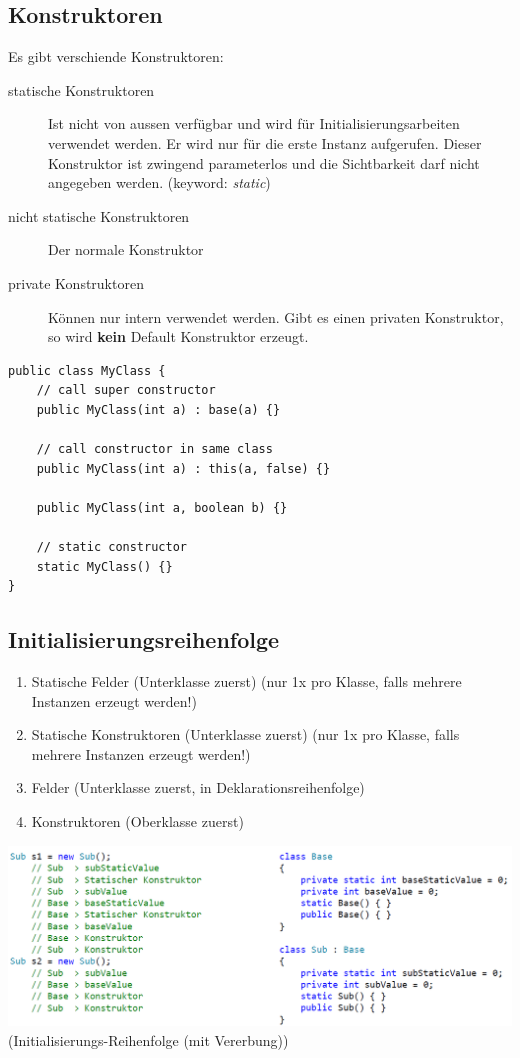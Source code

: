 \documentclass[
a4paper,
oneside,
10pt,
fleqn,
headsepline,
toc=listofnumbered, 
bibliography=totocnumbered]{scrartcl}
\begin{document}
\subsection{Konstruktoren}
Es gibt verschiende Konstruktoren:
\begin{description}
	\item[statische Konstruktoren] Ist nicht von aussen verfügbar und wird für Initialisierungsarbeiten verwendet werden. Er wird nur für die erste Instanz aufgerufen. Dieser Konstruktor ist zwingend parameterlos und die Sichtbarkeit darf nicht angegeben werden. (keyword: \textit{static})
	\item[nicht statische Konstruktoren] Der normale Konstruktor
	\item[private Konstruktoren] Können nur intern verwendet werden. Gibt es einen privaten Konstruktor, so wird \textbf{kein} Default Konstruktor erzeugt.
\end{description}
\begin{lstlisting}
public class MyClass {
	// call super constructor
	public MyClass(int a) : base(a) {}

	// call constructor in same class
	public MyClass(int a) : this(a, false) {}
	
	public MyClass(int a, boolean b) {}
	
	// static constructor
	static MyClass() {}
}
\end{lstlisting}

\subsection{Initialisierungsreihenfolge}
\begin{enumerate}
	\item Statische Felder (Unterklasse zuerst) (nur 1x pro Klasse, falls mehrere Instanzen erzeugt werden!)
	\item Statische Konstruktoren (Unterklasse zuerst) (nur 1x pro Klasse, falls mehrere Instanzen erzeugt werden!)
	\item Felder (Unterklasse zuerst, in Deklarationsreihenfolge)
	\item Konstruktoren (Oberklasse zuerst)
\end{enumerate}



\begin{minipage}[t]{1\textwidth}
	\centering
	\includegraphics[width=0.9\linewidth]{images/init_order}
	(Initialisierungs-Reihenfolge (mit Vererbung))
\end{minipage}
\end{document}
